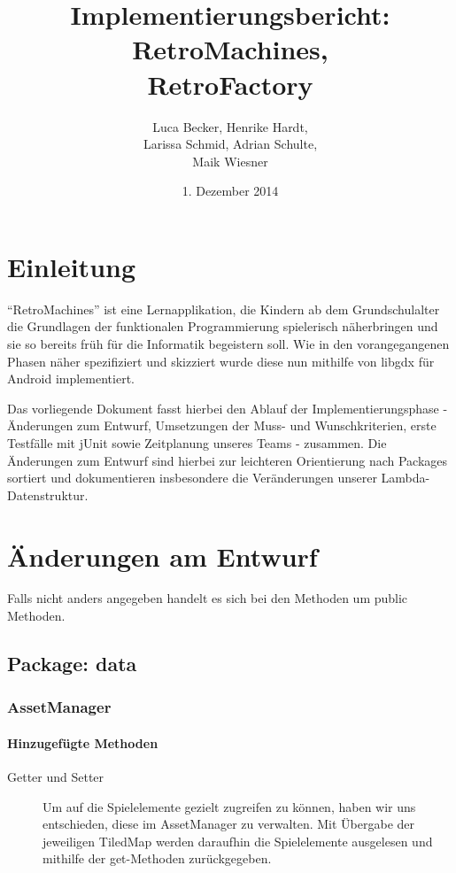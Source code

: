 \documentclass[parskip=full]{scrreprt}
\begin{document}
\title{Implementierungsbericht: RetroMachines, \\ RetroFactory}
\author{Luca Becker, Henrike Hardt,\\Larissa Schmid, Adrian Schulte,\\Maik Wiesner}
\date{1. Dezember 2014}
\maketitle
\thispagestyle{empty}

\clearpage

\thispagestyle{empty}
\tableofcontents
\thispagestyle{empty}

\clearpage
\setcounter{page}{1}

\chapter{Einleitung}

\enquote{RetroMachines} ist eine Lernapplikation, die Kindern ab dem Grundschulalter die Grundlagen der funktionalen Programmierung spielerisch näherbringen und sie so bereits früh für die Informatik begeistern soll. Wie in den vorangegangenen Phasen näher spezifiziert und skizziert wurde diese nun mithilfe von libgdx für Android implementiert.

Das vorliegende Dokument fasst hierbei den Ablauf der Implementierungsphase - Änderungen zum Entwurf, Umsetzungen der Muss- und Wunschkriterien, erste Testfälle mit jUnit sowie Zeitplanung unseres Teams - zusammen. Die Änderungen zum Entwurf sind hierbei zur leichteren Orientierung nach Packages sortiert und dokumentieren insbesondere die Veränderungen unserer Lambda-Datenstruktur.

\chapter{Änderungen am Entwurf}

Falls nicht anders angegeben handelt es sich bei den Methoden um public Methoden.

\section{Package: data}

\subsection{AssetManager}

\subsubsection{Hinzugefügte Methoden}
\begin{description}
	\item[Getter und Setter] Um auf die Spielelemente gezielt zugreifen zu können, haben wir uns entschieden, diese im AssetManager zu verwalten. Mit Übergabe der jeweiligen TiledMap werden daraufhin die Spielelemente ausgelesen und mithilfe der get-Methoden zurückgegeben.
\end{description}
\end{document}
